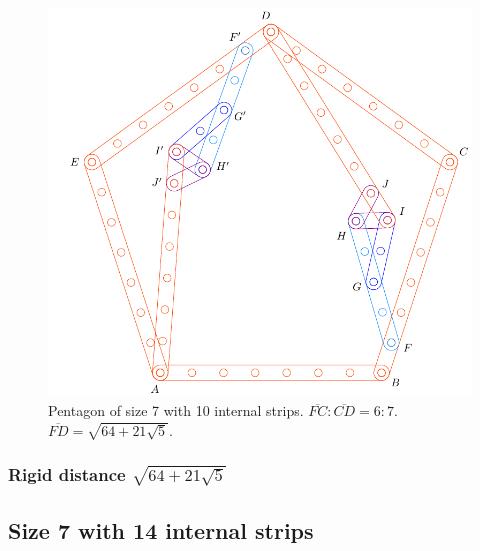 \documentclass[11pt]{article}
\begin{document}
\begin{figure}[H]
\centering
\includegraphics[scale=0.7]{7/penta7-10a}
\caption{Pentagon of size 7 with 10 internal strips. $\overline{FC}:\overline{CD} = 6:7$. $\overline{FD} = \sqrt{64 + 21\sqrt5}$.}
\label{fig:penta7-10a}
\end{figure}

\subsubsection{Rigid distance $\sqrt{64 + 21\sqrt5}$}

\subsection{Size 7 with 14 internal strips}
\end{document}
